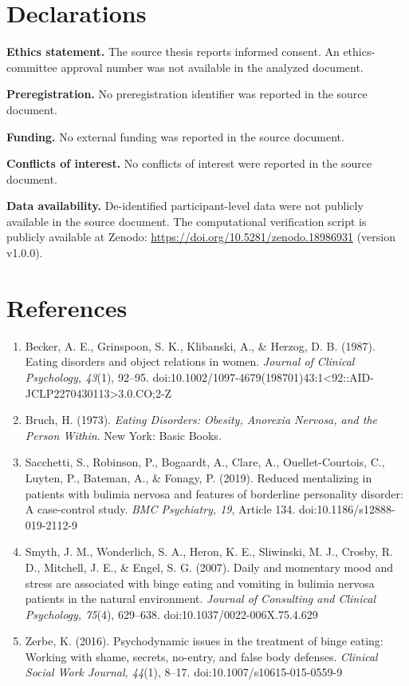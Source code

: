 \documentclass[12pt]{article}
\begin{document}
\section*{Declarations}
\textbf{Ethics statement.} The source thesis reports informed consent. An ethics-committee approval number was not available in the analyzed document.

\textbf{Preregistration.} No preregistration identifier was reported in the source document.

\textbf{Funding.} No external funding was reported in the source document.

\textbf{Conflicts of interest.} No conflicts of interest were reported in the source document.

\textbf{Data availability.} De-identified participant-level data were not publicly available in the source document. The computational verification script is publicly available at Zenodo: \href{https://doi.org/10.5281/zenodo.18986931}{https://doi.org/10.5281/zenodo.18986931} (version v1.0.0).

\section*{References}
\begin{enumerate}[leftmargin=*]
    \item Becker, A. E., Grinspoon, S. K., Klibanski, A., \& Herzog, D. B. (1987). Eating disorders and object relations in women. \textit{Journal of Clinical Psychology, 43}(1), 92--95. doi:10.1002/1097-4679(198701)43:1<92::AID-JCLP2270430113>3.0.CO;2-Z
    \item Bruch, H. (1973). \textit{Eating Disorders: Obesity, Anorexia Nervosa, and the Person Within}. New York: Basic Books.
    \item Sacchetti, S., Robinson, P., Bogaardt, A., Clare, A., Ouellet-Courtois, C., Luyten, P., Bateman, A., \& Fonagy, P. (2019). Reduced mentalizing in patients with bulimia nervosa and features of borderline personality disorder: A case-control study. \textit{BMC Psychiatry, 19}, Article 134. doi:10.1186/s12888-019-2112-9
    \item Smyth, J. M., Wonderlich, S. A., Heron, K. E., Sliwinski, M. J., Crosby, R. D., Mitchell, J. E., \& Engel, S. G. (2007). Daily and momentary mood and stress are associated with binge eating and vomiting in bulimia nervosa patients in the natural environment. \textit{Journal of Consulting and Clinical Psychology, 75}(4), 629--638. doi:10.1037/0022-006X.75.4.629
    \item Zerbe, K. (2016). Psychodynamic issues in the treatment of binge eating: Working with shame, secrets, no-entry, and false body defenses. \textit{Clinical Social Work Journal, 44}(1), 8--17. doi:10.1007/s10615-015-0559-9
\end{enumerate}
\end{document}
